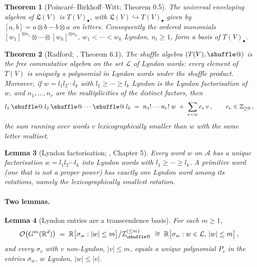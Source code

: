 \documentclass[11pt,english]{article}
\makeatletter
\providecommand*{\shuffle}{\mathbin{\mathpalette\shuffle@{}}}
\newcommand*{\shuffle@}[2]{%
  \sbox0{$#1\vcenter{}$}%
  \kern .15\ht0
  \rlap{\vrule height .25\ht0 depth 0pt width 2.5\ht0}%
  \raise.1\ht0\hbox to 2.5\ht0{%
    \vrule height 1.75\ht0 depth -.1\ht0 width .17\ht0
    \hfill
    \vrule height 1.75\ht0 depth -.1\ht0 width .17\ht0
    \hfill
    \vrule height 1.75\ht0 depth -.1\ht0 width .17\ht0}%
  \kern .15\ht0
}
\newtheorem{theorem}{Theorem}
\newtheorem{lemma}[theorem]{Lemma}
\theoremstyle{definition}
\theoremstyle{remark}
\makeatother
\begin{document}
\begin{theorem}[Poincaré--Birkhoff--Witt; \cite{Reutenauer} Theorem 0.5]
\label{thm:PBW}
The universal enveloping algebra of $\mathfrak{L}(V)$ is $T(V)_{\bullet}$,
with $\mathfrak{L}(V)\hookrightarrow T(V)_{\bullet}$ given by
$[a,b]=a\otimes b-b\otimes a$ on letters. Consequently the ordered
monomials $[w_{1}]^{\otimes n_{1}}\otimes\cdots\otimes[w_{k}]^{\otimes n_{k}}$,
$w_{1}<\cdots<w_{k}$ Lyndon, $n_{i}\geq1$, form a basis of
$T(V)_{\bullet}$.
\end{theorem}

\begin{theorem}[Radford; \cite{Radford}, \cite{Reutenauer} Theorem 6.1]
\label{thm:Radford}
The shuffle algebra $(T(V),\shuffle)$ is the free commutative algebra
on the set $\mathcal{L}$ of Lyndon words: every element of $T(V)$ is
uniquely a polynomial in Lyndon words under the shuffle product.
Moreover, if $w=l_{1}l_{2}\cdots l_{k}$ with $l_{1}\geq\cdots\geq l_{k}$
Lyndon is the Lyndon factorisation of $w$, and $n_{1},\ldots,n_{r}$ are
the multiplicities of the distinct factors, then
\begin{equation}
l_{1}\shuffle l_{2}\shuffle\cdots\shuffle l_{k}\;=\;n_{1}!\cdots n_{r}!\;w\;+\;\sum_{v<w}c_{v}\,v\,,\qquad c_{v}\in\mathbb{Z}_{\geq0}\,,\label{eq:Radford-triangular}
\end{equation}
the sum running over words $v$ lexicographically smaller than $w$
with the same letter multiset.
\end{theorem}

\begin{lemma}[Lyndon factorisation; \cite{Reutenauer}, Chapter 5]
\label{lem:Duval}
Every word $w$ on $\mathcal{A}$ has a unique factorisation
$w=l_{1}l_{2}\cdots l_{k}$ into Lyndon words with $l_{1}\geq\cdots\geq l_{k}$.
A primitive word (one that is not a proper power) has exactly one
Lyndon word among its rotations, namely the lexicographically smallest
rotation.
\end{lemma}

\paragraph{Two lemmas.}

\begin{lemma}[Lyndon entries are a transcendence basis]
\label{lem:transcendence}
For each $m\geq1$,
\begin{equation}
\mathcal{O}\bigl(G^{m}(\mathbb{R}^{d})\bigr)\;=\;\mathbb{R}\bigl[\sigma_{w}:|w|\leq m\bigr]\big/\mathcal{I}_{\shuffle}^{(\leq m)}\;\cong\;\mathbb{R}\bigl[\sigma_{w}:w\in\mathcal{L},\,|w|\leq m\bigr]\,,\label{eq:RadfordTruncated}
\end{equation}
and every $\sigma_{v}$ with $v$ non-Lyndon, $|v|\leq m$, equals a
unique polynomial $P_{v}$ in the entries $\sigma_{w}$, $w$ Lyndon,
$|w|\leq|v|$.
\end{lemma}
\end{document}

